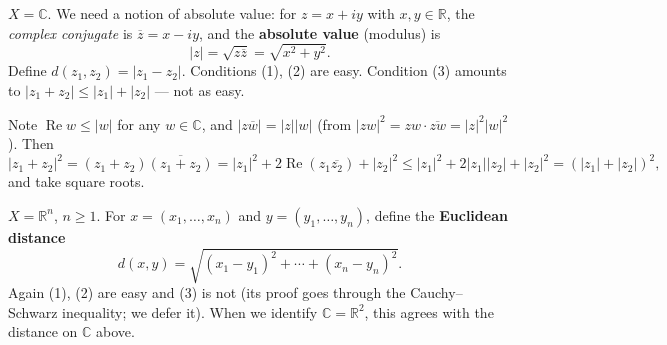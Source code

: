 \documentclass[11pt]{report}
\begin{document}
\begin{exbox}
$X = \mathbb{C}$. We need a notion of absolute value: for $z = x + iy$ with $x, y \in \mathbb{R}$, the \emph{complex conjugate} is $\overline{z} = x - iy$, and the \textbf{absolute value} (modulus) is
\[
|z| = \sqrt{z \overline{z}} = \sqrt{x^2 + y^2}.
\]
Define $d(z_1, z_2) = |z_1 - z_2|$. Conditions (1), (2) are easy. Condition (3) amounts to $|z_1 + z_2| \leq |z_1| + |z_2|$ --- not as easy.
\end{exbox}

\begin{rembox}
Note $\operatorname{Re} w \leq |w|$ for any $w \in \mathbb{C}$, and $|z \overline{w}| = |z||w|$ (from $|zw|^2 = zw \cdot \overline{zw} = |z|^2 |w|^2$). Then
\[
|z_1 + z_2|^2 = (z_1 + z_2)\overline{(z_1 + z_2)} = |z_1|^2 + 2 \operatorname{Re}(z_1 \overline{z_2}) + |z_2|^2
\leq |z_1|^2 + 2 |z_1| |z_2| + |z_2|^2 = (|z_1| + |z_2|)^2,
\]
and take square roots.
\end{rembox}

\begin{exbox}
$X = \mathbb{R}^n$, $n \geq 1$. For $x = (x_1, \ldots, x_n)$ and $y = (y_1, \ldots, y_n)$, define the \textbf{Euclidean distance}
\[
d(x,y) = \sqrt{(x_1 - y_1)^2 + \cdots + (x_n - y_n)^2}.
\]
Again (1), (2) are easy and (3) is not (its proof goes through the Cauchy--Schwarz inequality; we defer it). When we identify $\mathbb{C} = \mathbb{R}^2$, this agrees with the distance on $\mathbb{C}$ above.
\end{exbox}
\end{document}
